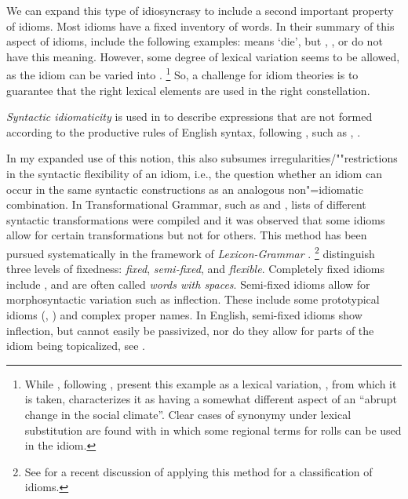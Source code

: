 \documentclass[output=paper
                ,modfonts
                ,nonflat
	        ,collection
	        ,collectionchapter
	        ,collectiontoclongg
 	        ,biblatex
                ,babelshorthands
                ,newtxmath
                ,draftmode
                ,colorlinks, citecolor=brown
]{./langsci/langscibook}
\begin{document}
\eal \label{trice}
\zl 

We can expand this type of idiosyncrasy to include  a second important property of idioms. 
Most idioms have a fixed inventory of words. In their summary of this aspect of idioms, \cite[--828]{Gibbs:Colston:07} include the following examples:  means `die', but , , or  do not have this meaning. However, some degree of lexical variation seems to be allowed, as
the idiom  can be varied into .%
\footnote{\label{fn-semmeln}While \citet{Gibbs:Colston:07}, following \citet{Gibbs:al:89}, present this example as a lexical variation, \cite[]{Glucksberg:01}, from which it is taken, characterizes it as having a somewhat different aspect of an ``abrupt change in the social climate''. Clear cases of synonymy under lexical substitution are found with   in which some regional terms for rolls can be used in  the idiom.}
 So, a challenge for idiom theories is to guarantee that the 
right lexical elements are used in the right constellation.

\emph{Syntactic idiomaticity} is used in \citet{Baldwin:Kim:10} to describe expressions that are not formed according to the productive rules of English syntax, following \citet{FKoC88a}, such as , .  

In my expanded use of this notion, this also subsumes irregularities/""restrictions in the syntactic flexibility of an idiom, i.e., the question whether an idiom can occur in the same syntactic constructions as an analogous non"=idiomatic combination. In Transformational Grammar, such as \citet{Weinreich:69} and \citet{Fraser:70}, lists of different syntactic transformations were compiled and it was observed that some idioms allow for certain transformations but not for others. This method has been pursued systematically in the framework of \emph{Lexicon-Grammar} \citep{Gross:82}.%
\footnote{See \citet{Laporte:18} for a recent discussion of applying this method for a classification of idioms.}
%
\citet{SBBCF2002a-ausgedruckt} distinguish three levels of fixedness: \emph{fixed}, \emph{semi-fixed}, and \emph{flexible}. 
Completely fixed idioms include ,  and are often called \emph{words with spaces}.
Semi-fixed idioms allow for morphosyntactic variation such as inflection. These include some prototypical idioms (, ) and complex proper names. In English, semi-fixed idioms show inflection, but cannot easily be passivized, nor do they allow for parts of the idiom being topicalized, see .
\end{document}
